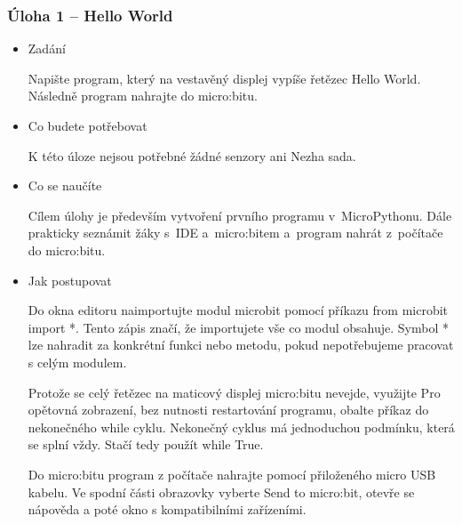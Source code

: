 \documentclass[
  digital,     %
  oneside,     %
  nosansbold,  %
  colorbold, %
  lof,         %
  nolot,         %
]{fithesis4}
\begin{document}
\subsubsection{Úloha 1 -- Hello World}
\begin{itemize}
    \item Zadání
    
Napište program, který na vestavěný displej vypíše řetězec Hello World. Následně program nahrajte do micro:bitu.
    \item Co budete potřebovat

K této úloze nejsou potřebné žádné senzory ani Nezha sada.
    \item Co se naučíte

Cílem úlohy je především vytvoření prvního programu v~MicroPythonu. Dále prakticky seznámit žáky s~IDE a~micro:bitem a~program nahrát z~počítače do micro:bitu.
\item Jak postupovat

Do okna editoru naimportujte modul microbit pomocí příkazu from microbit import *. Tento zápis značí, že importujete vše co modul obsahuje. Symbol * lze nahradit za konkrétní funkci nebo metodu, pokud nepotřebujeme pracovat s celým modulem.

Protože se celý řetězec na maticový displej micro:bitu nevejde, využijte Pro opětovná zobrazení, bez nutnosti restartování programu, obalte příkaz do nekonečného while cyklu. Nekonečný cyklus má jednoduchou podmínku, která se splní vždy. Stačí tedy použít while True.

Do micro:bitu program z počítače nahrajte pomocí přiloženého micro USB kabelu. Ve spodní části obrazovky vyberte Send to micro:bit, otevře se nápověda a poté okno s kompatibilními zařízeními.


\end{itemize}
\end{document}
